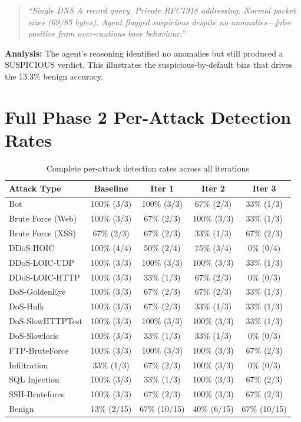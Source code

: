\documentclass[12pt, a4paper, oneside]{report}
\begin{document}
\begin{quote}
\small\itshape
``Single DNS A record query. Private RFC1918 addressing. Normal packet sizes
(69/85 bytes). Agent flagged suspicious despite no anomalies---false positive
from over-cautious base behaviour.''
\end{quote}

\textbf{Analysis:} The agent's reasoning identified no anomalies but still
produced a SUSPICIOUS verdict. This illustrates the suspicious-by-default bias
that drives the 13.3\% benign accuracy.


\chapter{Full Phase 2 Per-Attack Detection Rates}
\label{app:perattack}

\begin{table}[H]
\centering
\caption{Complete per-attack detection rates across all iterations}
\label{tab:full-perattack}
\small
\begin{tabular}{@{}lcccc@{}}
\toprule
\textbf{Attack Type} & \textbf{Baseline} & \textbf{Iter 1} & \textbf{Iter 2} & \textbf{Iter 3} \\
\midrule
Bot                   & 100\% (3/3) & 100\% (3/3) &  67\% (2/3) &  33\% (1/3) \\
Brute Force (Web)     & 100\% (3/3) &  67\% (2/3) & 100\% (3/3) &  33\% (1/3) \\
Brute Force (XSS)     &  67\% (2/3) &  67\% (2/3) &  33\% (1/3) &  67\% (2/3) \\
DDoS-HOIC             & 100\% (4/4) &  50\% (2/4) &  75\% (3/4) &   0\% (0/4) \\
DDoS-LOIC-UDP         & 100\% (3/3) & 100\% (3/3) & 100\% (3/3) &  33\% (1/3) \\
DDoS-LOIC-HTTP        & 100\% (3/3) &  33\% (1/3) &  67\% (2/3) &   0\% (0/3) \\
DoS-GoldenEye         & 100\% (3/3) &  67\% (2/3) &  67\% (2/3) &  33\% (1/3) \\
DoS-Hulk              & 100\% (3/3) &  67\% (2/3) &  33\% (1/3) &  33\% (1/3) \\
DoS-SlowHTTPTest      & 100\% (3/3) & 100\% (3/3) & 100\% (3/3) &  33\% (1/3) \\
DoS-Slowloris         & 100\% (3/3) &  33\% (1/3) &  33\% (1/3) &   0\% (0/3) \\
FTP-BruteForce        & 100\% (3/3) & 100\% (3/3) & 100\% (3/3) &  67\% (2/3) \\
Infiltration          &  33\% (1/3) &  67\% (2/3) & 100\% (3/3) &   0\% (0/3) \\
SQL Injection         & 100\% (3/3) &  33\% (1/3) & 100\% (3/3) &  67\% (2/3) \\
SSH-Bruteforce        & 100\% (3/3) &  67\% (2/3) & 100\% (3/3) &  67\% (2/3) \\
\midrule
Benign                &  13\% (2/15) &  67\% (10/15) &  40\% (6/15) &  67\% (10/15) \\
\bottomrule
\end{tabular}
\end{table}


\printbibliography[heading=bibintoc, title={References}]
\end{document}
